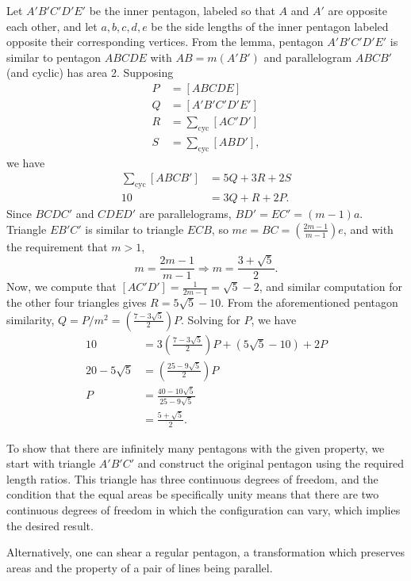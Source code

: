 \begin{enumerate}
 Let $A'B'C'D'E'$ be the inner pentagon, labeled so that $A$ and $A'$ are opposite each other, and let $a, b, c, d, e$ be the side lengths of the inner pentagon labeled opposite their corresponding vertices. From the lemma, pentagon $A'B'C'D'E'$ is similar to pentagon $ABCDE$ with $AB = m(A'B')$ and parallelogram $ABCB'$ (and cyclic) has area 2. Supposing
 \begin{align*} P &= [ABCDE] \\ Q &= [A'B'C'D'E'] \\ R &= \sum_{\text{cyc}}[AC'D'] \\ S &= \sum_{\text{cyc}}[ABD'], \end{align*}
we have
 \begin{align*} \sum_{\text{cyc}}[ABCB'] &= 5Q + 3R + 2S \\ 10 &= 3Q + R + 2P. \end{align*}
Since $BCDC'$ and $CDED'$ are parallelograms, $BD' = EC' = (m - 1)a$. Triangle $EB'C'$ is similar to triangle $ECB$, so $me = BC = \left(\frac{2m - 1}{m - 1}\right)e$, and with the requirement that $m > 1$,
 \[m = \frac{2m - 1}{m - 1}\Rightarrow m = \frac{3 + \sqrt{5}}{2}.\]Now, we compute that $[AC'D'] = \frac{1}{2m - 1} = \sqrt{5} - 2$, and similar computation for the other four triangles gives $R = 5\sqrt{5} - 10$. From the aforementioned pentagon similarity, $Q = P/m^2 = \left(\frac{7 - 3\sqrt{5}}{2}\right)P$. Solving for $P$, we have
 \begin{align*} 10 &= 3\left(\frac{7 - 3\sqrt{5}}{2}\right)P + (5\sqrt{5} - 10) + 2P \\ 20 - 5\sqrt{5} &= \left(\frac{25 - 9\sqrt{5}}{2}\right)P \\ P &= \frac{40 - 10\sqrt{5}}{25 - 9\sqrt{5}} \\ &= \frac{5 + \sqrt{5}}{2}. \end{align*}


 To show that there are infinitely many pentagons with the given property, we start with triangle $A'B'C'$ and construct the original pentagon using the required length ratios. This triangle has three continuous degrees of freedom, and the condition that the equal areas be specifically unity means that there are two continuous degrees of freedom in which the configuration can vary, which implies the desired result.

 Alternatively, one can shear a regular pentagon, a transformation which preserves areas and the property of a pair of lines being parallel.

 


\end{enumerate}